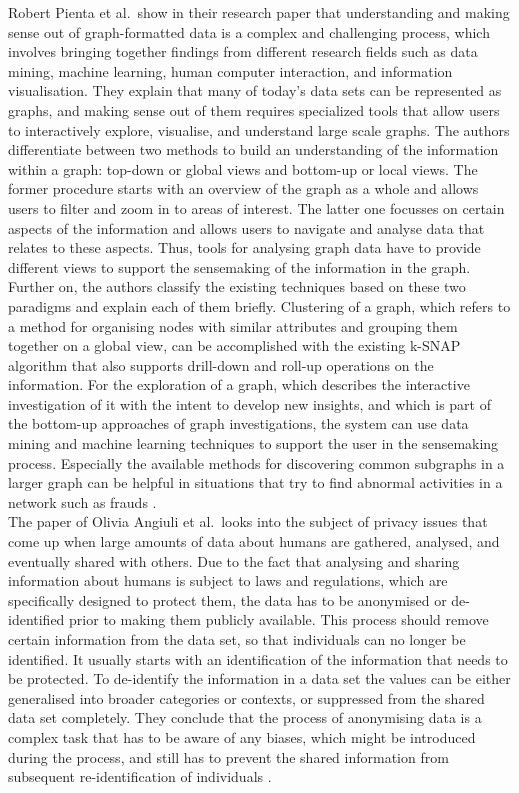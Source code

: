 Robert Pienta et al.\ show in their research paper that understanding and making sense out of graph-formatted data is a complex and challenging process, which involves bringing together findings from different research fields such as data mining, machine learning, human computer interaction, and information visualisation. They explain that many of today’s data sets can be represented as graphs, and making sense out of them requires specialized tools that allow users to interactively explore, visualise, and understand large scale graphs. The authors differentiate between two methods to build an understanding of the information within a graph: top-down or global views and bottom-up or local views. The former procedure starts with an overview of the graph as a whole and allows users to filter and zoom in to areas of interest. The latter one focusses on certain aspects of the information and allows users to navigate and analyse data that relates to these aspects. Thus, tools for analysing graph data have to provide different views to support the sensemaking of the information in the graph. Further on, the authors classify the existing techniques based on these two paradigms and explain each of them briefly. Clustering of a graph, which refers to a method for organising nodes with similar attributes and grouping them together on a global view, can be accomplished with the existing k-SNAP algorithm that also supports drill-down and roll-up operations on the information. For the exploration of a graph, which describes the interactive investigation of it with the intent to develop new insights, and which is part of the bottom-up approaches of graph investigations, the system can use data mining and machine learning techniques to support the user in the sensemaking process. Especially the available methods for discovering common subgraphs in a larger graph can be helpful in situations that try to find abnormal activities in a network such as frauds \citep{pienta2015scalable}. \\

The paper of Olivia Angiuli et al.\ looks into the subject of privacy issues that come up when large amounts of data about humans are gathered, analysed, and eventually shared with others. Due to the fact that analysing and sharing information about humans is subject to laws and regulations, which are specifically designed to protect them, the data has to be anonymised or de-identified prior to making them publicly available. This process should remove certain information from the data set, so that individuals can no longer be identified. It usually starts with an identification of the information that needs to be protected. To de-identify the information in a data set the values can be either generalised into broader categories or contexts, or suppressed from the shared data set completely. They conclude that the process of anonymising data is a complex task that has to be aware of any biases, which might be introduced during the process, and still has to prevent the shared information from subsequent re-identification of individuals \citep{angiuli2015identify}.

